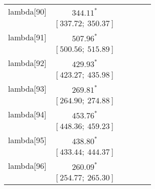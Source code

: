 \begin{table}
\begin{center}
\begin{tabular}{l c c c c c }
lambda[90]  & $344.11^{*}$                     &                           &                           &                         &                         \\
            & $[337.72;\ 350.37]$              &                           &                           &                         &                         \\
lambda[91]  & $507.96^{*}$                     &                           &                           &                         &                         \\
            & $[500.56;\ 515.89]$              &                           &                           &                         &                         \\
lambda[92]  & $429.93^{*}$                     &                           &                           &                         &                         \\
            & $[423.27;\ 435.98]$              &                           &                           &                         &                         \\
lambda[93]  & $269.81^{*}$                     &                           &                           &                         &                         \\
            & $[264.90;\ 274.88]$              &                           &                           &                         &                         \\
lambda[94]  & $453.76^{*}$                     &                           &                           &                         &                         \\
            & $[448.36;\ 459.23]$              &                           &                           &                         &                         \\
lambda[95]  & $438.80^{*}$                     &                           &                           &                         &                         \\
            & $[433.44;\ 444.37]$              &                           &                           &                         &                         \\
lambda[96]  & $260.09^{*}$                     &                           &                           &                         &                         \\
            & $[254.77;\ 265.30]$              &                           &                           &                         &                         \\

\end{tabular}
\end{center}
\end{table}

